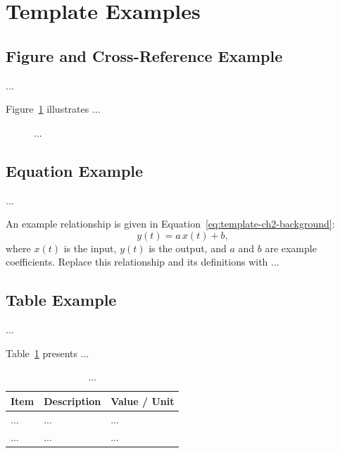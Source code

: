 \section{Template Examples}
\label{sec:template-ch2-background}

\subsection{Figure and Cross-Reference Example}
...

Figure~\ref{fig:template-ch2-background} illustrates ...
\begin{figure}[htbp]
    \centering
    \caption{...}
    \label{fig:template-ch2-background}
\end{figure}

\subsection{Equation Example}
...

An example relationship is given in Equation~\eqref{eq:template-ch2-background}:
\begin{equation}
    y(t) = a\,x(t) + b,
    \label{eq:template-ch2-background}
\end{equation}
where $x(t)$ is the input, $y(t)$ is the output, and $a$ and $b$ are
example coefficients. Replace this relationship and its definitions with ...

\subsection{Table Example}
...

Table~\ref{tab:template-ch2-background} presents ...
\begin{table}[htbp]
    \centering
    \caption{...}
    \label{tab:template-ch2-background}
    \begin{tabularx}{0.9\linewidth}{lXX}
        \toprule
        \textbf{Item} & \textbf{Description} & \textbf{Value / Unit} \\
        \midrule
        ... & ... & ... \\
        ... & ... & ... \\
        \bottomrule
    \end{tabularx}
\end{table}
